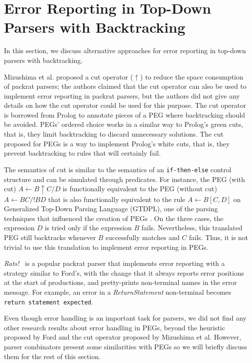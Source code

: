\documentclass[3p,12pt,singlecolumn]{elsarticle}
\begin{document}
\section{Error Reporting in Top-Down Parsers with Backtracking} 
\label{sec:rel}

In this section, we discuss alternative approaches for error reporting
in top-down parsers with backtracking.

Mizushima et al. \cite{mizushima2010php} proposed a cut operator
($\uparrow$) to reduce the space consumption of packrat parsers;
the authors claimed that the cut operator can also be used to
implement error reporting in packrat parsers, but the authors did
not give any details on how the cut operator could be used for this
purpose.
The cut operator is borrowed from Prolog to annotate pieces of
a PEG where backtracking should be avoided.
PEGs' ordered choice works in a similar way to Prolog's green cuts,
that is, they limit backtracking to discard unnecessary solutions.
The cut proposed for PEGs is a way to implement Prolog's white cuts,
that is, they prevent backtracking to rules that will certainly fail.

The semantics of cut is similar to the semantics of an
\texttt{if-then-else} control structure and
can be simulated through predicates.
For instance, the PEG (with cut) $A \leftarrow B \uparrow C / D$ is
functionally equivalent to the PEG (without cut)
$A \leftarrow B C / !B D$ that is also functionally equivalent to
the rule $A \leftarrow B[C,D]$ on Generalized Top-Down Parsing
Language (GTDPL), one of the parsing techniques that influenced the
creation of PEGs \cite{ford2002packrat,ford2002pappy,ford2004peg}.
On the three cases, the expression $D$ is tried only if the expression
$B$ fails.
Nevertheless, this translated PEG still backtracks 
whenever $B$ successfully matches and $C$ fails.
Thus, it is not trivial to use this translation to implement error
reporting in PEGs. 

\emph{Rats!}~\cite{grimm2006rats} is a popular packrat parser
that implements error reporting with a strategy similar to
Ford's, with the change that it always reports error positions
at the start of productions, and pretty-prints non-terminal names
in the error message. For example, an error in a {\em ReturnStatement}
non-terminal becomes {\tt return statement expected}.

Even though error handling is an important task for parsers,
we did not find any other research results about error handling in PEGs,
beyond the heuristic proposed by Ford and the cut operator
proposed by Mizushima et al.
However, parser combinators \cite{hutton1992hfp} present some
similarities with PEGs so we will briefly discuss them for the
rest of this section.
\end{document}

